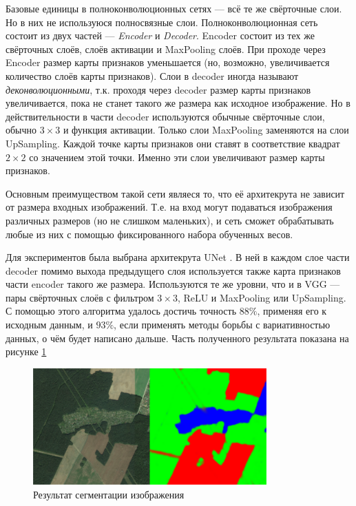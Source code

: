 Базовые единицы в полноконволюционных сетях --- всё те же свёрточные слои. Но в
них не используюся полносвязные слои.  Полноконволюционная сеть состоит из двух
частей --- \textit{Encoder} и \textit{Decoder}. Encoder состоит из тех же
свёрточных слоёв, слоёв активации и MaxPooling слоёв. При проходе через Encoder
размер карты признаков уменьшается (но, возможно, увеличивается количество слоёв
карты признаков). Слои в decoder иногда называют \textit{деконволюционными},
т.к. проходя через decoder размер карты признаков увеличивается, пока не станет
такого же размера как исходное изображение. Но в действительности в части
decoder используются обычные свёрточные слои, обычно $3 \times 3$ и функция
активации. Только слои MaxPooling заменяются на слои UpSampling. Каждой точке
карты признаков они ставят в соответствие квадрат $2 \times 2$ со значением этой
точки. Именно эти слои увеличивают размер карты признаков.

Основным преимуществом такой сети являеся то, что её архитекрута не зависит от
размера входных изображений. Т.е. на вход могут подаваться изображения различных
размеров (но не слишком маленьких), и сеть сможет обрабатывать любые из них
с помощью фиксированного набора обученных весов.

Для экспериментов была выбрана архитекрута UNet \cite{unet}. В ней в каждом слое части
decoder помимо выхода предыдущего слоя используется также карта признаков части
encoder такого же размера. Используются те же уровни, что и в VGG --- пары
свёрточных слоёв с фильтром $3 \times 3$, ReLU и MaxPooling или UpSampling.
С помощью этого алгоритма удалось достичь точность $88\%$, применяя его к
исходным данным, и $93\%$, если применять методы борьбы с вариативностью данных,
о чём будет написано дальше. %
Часть полученного результата показана на рисунке \ref{fig:segm_result}

\begin{figure}[p]
    \centering
    \caption{Результат сегментации изображения}
    \label{fig:segm_result}
    \includegraphics[width=0.8\textwidth]{images/segm_results_yandex.png}
\end{figure}

